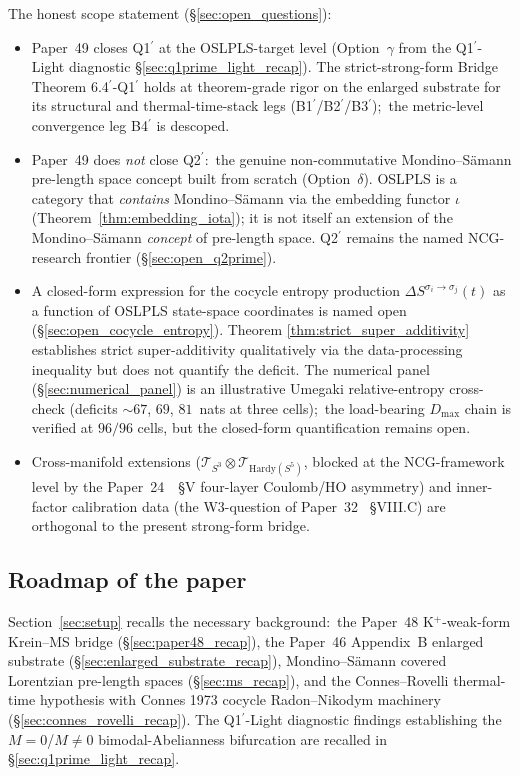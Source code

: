 \documentclass[11pt,a4paper]{article}
\theoremstyle{plain}
\theoremstyle{definition}
\newcommand{\sthree}{S^{3}}
\newcommand{\Tcal}{\mathcal{T}}
\newcommand{\DelS}[2]{\Delta S^{\sigma_{#1}\to\sigma_{#2}}}
\begin{document}
The honest scope statement (\S\ref{sec:open_questions}):
\begin{itemize}
\item Paper~49 closes Q1$^{\prime}$ at the OSLPLS-target level
(Option~$\gamma$ from the Q1$^{\prime}$-Light diagnostic
\S\ref{sec:q1prime_light_recap}). The strict-strong-form Bridge
Theorem 6.4$^{\prime}$-Q1$^{\prime}$ holds at theorem-grade rigor on
the enlarged substrate for its structural and thermal-time-stack legs
(B1$^{\prime}$/B2$^{\prime}$/B3$^{\prime}$);\ the metric-level
convergence leg B4$^{\prime}$ is descoped.
\item Paper~49 does \emph{not} close Q2$^{\prime}$:\ the genuine
non-commutative Mondino--S\"amann pre-length space concept built from
scratch (Option~$\delta$). OSLPLS is a category that \emph{contains}
Mondino--S\"amann via the embedding functor $\iota$
(Theorem~\ref{thm:embedding_iota}); it is not itself an extension of
the Mondino--S\"amann \emph{concept} of pre-length space. Q2$^{\prime}$
remains the named NCG-research frontier
(\S\ref{sec:open_q2prime}).
\item A closed-form expression for the cocycle entropy production
$\DelS{i}{j}(t)$ as a function of OSLPLS state-space coordinates is
named open (\S\ref{sec:open_cocycle_entropy}). Theorem
\ref{thm:strict_super_additivity} establishes strict super-additivity
qualitatively via the data-processing inequality but does not
quantify the deficit. The numerical panel (\S\ref{sec:numerical_panel})
is an illustrative Umegaki relative-entropy cross-check (deficits
$\sim 67$, $69$, $81$~nats at three cells);\ the load-bearing $D_{\max}$
chain is verified at $96/96$ cells, but the
closed-form quantification remains open.
\item Cross-manifold extensions
($\Tcal_{\sthree}\otimes\Tcal_{\mathrm{Hardy}(S^{5})}$, blocked at the
NCG-framework level by the Paper~24~\cite{paper24}~\S V four-layer
Coulomb/HO asymmetry) and inner-factor calibration data (the
W3-question of Paper~32~\cite{paper32} \S VIII.C) are orthogonal to
the present strong-form bridge.
\end{itemize}

\subsection{Roadmap of the paper}\label{sec:roadmap}

Section~\ref{sec:setup} recalls the necessary background:\ the
Paper~48 K$^{+}$-weak-form Krein--MS bridge
(\S\ref{sec:paper48_recap}), the Paper~46 Appendix~B enlarged
substrate (\S\ref{sec:enlarged_substrate_recap}), Mondino--S\"amann
covered Lorentzian pre-length spaces (\S\ref{sec:ms_recap}), and the
Connes--Rovelli thermal-time hypothesis with Connes 1973 cocycle
Radon--Nikodym machinery (\S\ref{sec:connes_rovelli_recap}). The
Q1$^{\prime}$-Light diagnostic findings establishing the
$M=0$/$M\ne 0$ bimodal-Abelianness bifurcation are recalled in
\S\ref{sec:q1prime_light_recap}.
\end{document}
